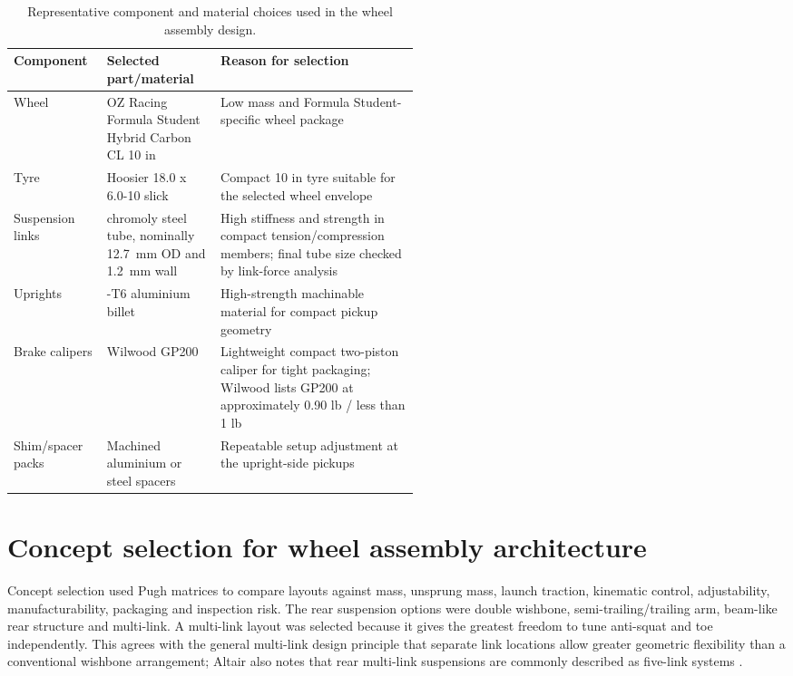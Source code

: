 \begin{table}[H]
\centering
\caption{Representative component and material choices used in the wheel assembly design.}
\label{tab:materials_wheel}
\setlength{\tabcolsep}{4pt}
\begin{tabularx}{\linewidth}{|>{\raggedright\arraybackslash}p{0.23\linewidth}|>{\raggedright\arraybackslash}p{0.29\linewidth}|>{\raggedright\arraybackslash}X|}
\hline
\textbf{Component} & \textbf{Selected part/material} & \textbf{Reason for selection} \\
\hline
Wheel & OZ Racing Formula Student Hybrid Carbon CL 10 in & Low mass and Formula Student-specific wheel package \\
\hline
Tyre & Hoosier 18.0 x 6.0-10 slick & Compact 10 in tyre suitable for the selected wheel envelope \\
\hline
Suspension links & 4130 chromoly steel tube, nominally \SI{12.7}{mm} OD and \SI{1.2}{mm} wall & High stiffness and strength in compact tension/compression members; final tube size checked by link-force analysis \parencite{zxMatweb4130} \\
\hline
Uprights & 7075-T6 aluminium billet & High-strength machinable material for compact pickup geometry \parencite{zxMatweb7075} \\
\hline
Brake calipers & Wilwood GP200 & Lightweight compact two-piston caliper for tight packaging; Wilwood lists GP200 at approximately 0.90 lb / less than 1 lb \parencite{zxWilwoodGP200} \\
\hline
Shim/spacer packs & Machined aluminium or steel spacers & Repeatable setup adjustment at the upright-side pickups \\
\hline
\end{tabularx}
\end{table}

\section{Concept selection for wheel assembly architecture}

Concept selection used Pugh matrices to compare layouts against mass, unsprung mass, launch traction, kinematic control, adjustability, manufacturability, packaging and inspection risk. The rear suspension options were double wishbone, semi-trailing/trailing arm, beam-like rear structure and multi-link. A multi-link layout was selected because it gives the greatest freedom to tune anti-squat and toe independently. This agrees with the general multi-link design principle that separate link locations allow greater geometric flexibility than a conventional wishbone arrangement; Altair also notes that rear multi-link suspensions are commonly described as five-link systems \parencite{zxAltairMultilink}.

